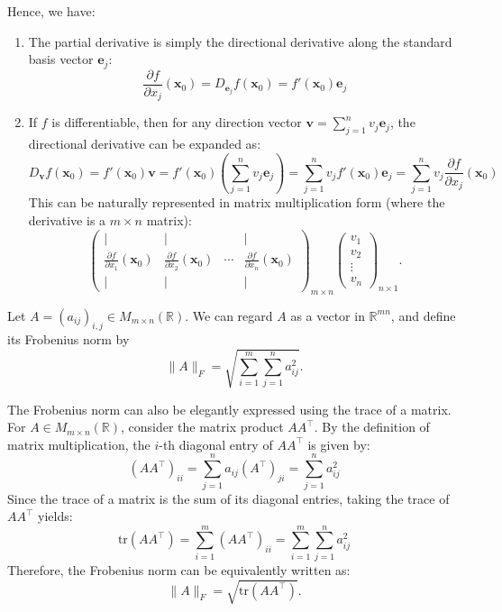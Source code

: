 \documentclass[12pt]{article}
\begin{document}
Hence, we have:
\begin{enumerate}
    \item The partial derivative is simply the directional derivative along the standard basis vector $\mathbf{e}_j:$
    $$ \frac{\partial f}{\partial x_j}(\mathbf{x}_0) = D_{\mathbf{e}_j} f(\mathbf{x}_0) = f'(\mathbf{x}_0) \mathbf{e}_j $$
    
    \item If $f$ is differentiable, then for any direction vector $\mathbf{v} = \sum_{j=1}^n v_j \mathbf{e}_j$, the directional derivative can be expanded as:
    $$ D_{\mathbf{v}} f(\mathbf{x}_0) = f'(\mathbf{x}_0) \mathbf{v} = f'(\mathbf{x}_0) \left( \sum_{j=1}^n v_j \mathbf{e}_j \right) = \sum_{j=1}^n v_j f'(\mathbf{x}_0) \mathbf{e}_j = \sum_{j=1}^n v_j \frac{\partial f}{\partial x_j}(\mathbf{x}_0) $$
    This can be naturally represented in matrix multiplication form (where the derivative is a $m \times n$ matrix):
    $$ \begin{pmatrix}
    | & | & & | \\
    \frac{\partial f}{\partial x_1}(\mathbf{x}_0) & \frac{\partial f}{\partial x_2}(\mathbf{x}_0) & \cdots & \frac{\partial f}{\partial x_n}(\mathbf{x}_0) \\
    | & | & & |
    \end{pmatrix}_{m \times n}
    \begin{pmatrix}
    v_1 \\
    v_2 \\
    \vdots \\
    v_n
    \end{pmatrix}_{n \times 1}. $$
\end{enumerate}



\begin{definition}
Let $A=(a_{ij})_{i,j}\in M_{m\times n}(\mathbb{R})$. We can regard $A$ as a vector in $\mathbb{R}^{mn}$, and define its
Frobenius norm by
$$\|A\|_F = \sqrt{\sum_{i=1}^m \sum_{j=1}^n a_{ij}^2}.$$
\end{definition}

\begin{remark}
The Frobenius norm can also be elegantly expressed using the trace of a matrix. 
For $A \in M_{m \times n}(\mathbb{R})$, consider the matrix product $A A^\top$. By the definition of matrix multiplication, the $i$-th diagonal entry of $A A^\top$ is given by:
$$(A A^\top)_{ii} = \sum_{j=1}^n a_{ij} (A^\top)_{ji} = \sum_{j=1}^n a_{ij}^2$$
Since the trace of a matrix is the sum of its diagonal entries, taking the trace of $A A^\top$ yields:
$$\text{tr}(A A^\top) = \sum_{i=1}^m (A A^\top)_{ii} = \sum_{i=1}^m \sum_{j=1}^n a_{ij}^2$$
Therefore, the Frobenius norm can be equivalently written as:
$$\|A\|_F = \sqrt{\text{tr}(A A^\top)}.$$
\end{remark}
\end{document}

